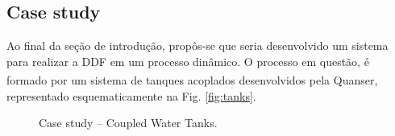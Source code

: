 \documentclass[10pt,fleqn,a4paper]{article}
\newcommand{\reg}{\textsuperscript{\textregistered}}
\begin{document}
\subsection{Case study}
Ao final da seção de introdução, propôs-se que seria desenvolvido um sistema
para realizar a DDF em um processo dinâmico. O processo em questão, é formado
por um sistema de tanques acoplados desenvolvidos pela Quanser\reg, representado
esquematicamente na Fig. \ref{fig:tanks}.

\begin{figure}[htb]
\centering
{}
\qquad
{}
    \caption{Case study -- Coupled Water Tanks.}
\end{figure}

\end{document}
